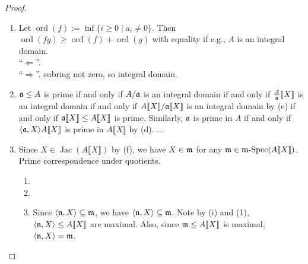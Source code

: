 \begin{proof}
\begin{enumerate}
        \item 
            Let $\operatorname{ord}(f) := \inf\{i \geq 0 \mid a_i \neq 0\}$. Then $\operatorname{ord}(fg) \geq \operatorname{ord}(f) + \operatorname{ord}(g)$ with equality if e.g., $A$ is an integral domain. \\
            ``$\Leftarrow$''. \\
            ``$\Rightarrow$''. subring not zero, so integral domain.
        \item 
            $\mathfrak{a} \leq A$ is prime if and only if $A/\mathfrak{a}$ is an integral domain if and only if $\frac{A}{\mathfrak{a}}\llbracket X \rrbracket$ is an integral domain if and only if $A\llbracket X \rrbracket/\mathfrak{a} \llbracket X \rrbracket$ is an integral domain by (c) if and only if $\mathfrak{a}\llbracket X \rrbracket \leq A \llbracket X \rrbracket$ is prime. Similarly, $\mathfrak{a}$ is prime in $A$ if and only if $\langle \mathfrak{a},X \rangle A\llbracket X \rrbracket$ is prime in $A\llbracket X \rrbracket$ by (d). ... 
        \item Since $X \in \operatorname{Jac}(A\llbracket X \rrbracket)$ by (f), we have $X \in \mathfrak{m}$ for any $\mathfrak{m} \in \operatorname{m-Spec}(A\llbracket X \rrbracket)$. Prime correspondence under quotients.
            \begin{enumerate}
                \item 
                \item 
                \item Since $\langle \mathfrak{n},X \rangle \subseteq \mathfrak{m}$, we have $\langle \mathfrak{n},X \rangle \subseteq \mathfrak{m}$. Note by (i) and (1), $\langle \mathfrak{n},X \rangle \leq A \llbracket X \rrbracket$ are maximal. Also, since $\mathfrak{m} \leq A\llbracket X \rrbracket$ is maximal, $\langle \mathfrak{n},X \rangle = \mathfrak{m}$. \qedhere
            \end{enumerate} 
        \qedhere
    \end{enumerate}
\end{proof}


